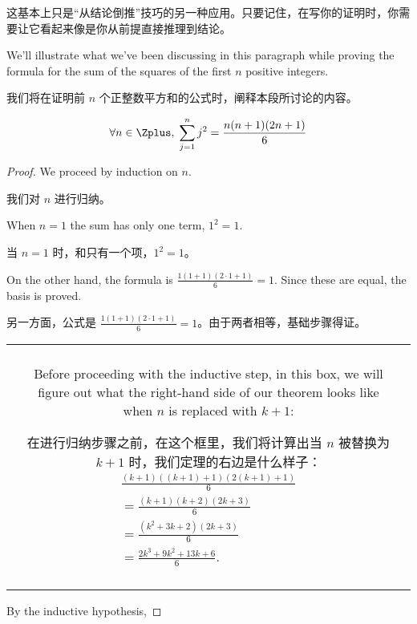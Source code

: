 这基本上只是“从结论倒推”技巧的另一种应用。只要记住，在写你的证明时，你需要让它看起来像是你从前提直接推理到结论。

We'll illustrate
what we've been discussing in this paragraph while proving
the formula for the sum of the squares of the first $n$ positive integers.

我们将在证明前 $n$ 个正整数平方和的公式时，阐释本段所讨论的内容。
\begin{thm}
\[ \forall n \in \Zplus, \; \sum_{j=1}^n j^2 = \frac{n(n+1)(2n+1)}{6} \]
\end{thm}

\begin{proof}
We proceed by induction on $n$.

我们对 $n$ 进行归纳。

 When $n = 1$ the sum has only one term, $1^2 = 1$.

当 $n = 1$ 时，和只有一个项，$1^2 = 1$。

On the other hand, the formula is 
$\displaystyle \frac{1(1+1)(2\cdot 1+1)}{6} = 1$.  Since these are equal, the 
basis is proved.

另一方面，公式是 $\displaystyle \frac{1(1+1)(2\cdot 1+1)}{6} = 1$。由于两者相等，基础步骤得证。



\begin{tabular}{|ccc|} \hline
 & &\\
 & \begin{minipage}{4 in} 
Before proceeding with the inductive step, in this box, we will
figure out what the right-hand side of our theorem looks like 
when $n$ is replaced with $k+1$:

在进行归纳步骤之前，在这个框里，我们将计算出当 $n$ 被替换为 $k+1$ 时，我们定理的右边是什么样子：
\begin{gather*}
 \frac{(k+1)((k+1)+1)(2(k+1)+1)}{6} \\
= \frac{(k+1)(k+2)(2k+3)}{6} \\
= \frac{(k^2+3k+2)(2k+3)}{6} \\
= \frac{2k^3+9k^2+13k+6}{6}.
\end{gather*}
\end{minipage} & \\ 
 & & \\ \hline
\end{tabular}


By the inductive hypothesis,


\end{proof}
